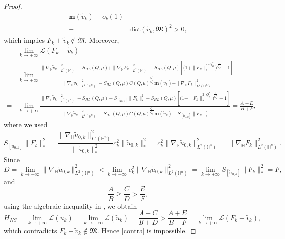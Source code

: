 \documentclass[10pt,a4paper]{amsart}
\begin{document}
\begin{proof}
\begin{align*}
 \mathbf{m}(\tilde{v}_k)+o_k(1)\\
 =&\mathrm{dist}(\tilde{v}_k,\mathfrak{M})^2>0,
 \end{align*}
{which implies $F_k+\tilde v_k\notin\mathfrak M$. Moreover,}
 \begin{align*}
 &\lim\limits_{k\rightarrow+\infty} \mathcal{L}(F_k+\tilde{v}_k)\\=&
\lim\limits_{k\rightarrow+\infty}\frac{\|\nabla_\mathbb{H} \tilde{v}_k\|_{L^2(\mathbb{H}^n)}^2-S_{HL}(Q,\mu)+\|\nabla_\mathbb{H} F_k\|_{L^2(\mathbb{H}^n)}^2-S_{HL}(Q,\mu) \left[\Big(1+\|F_k\|_*^{2\cdot Q^{\ast}_{\mu}}\Big)^{\frac{1}{Q^{\ast}_{\mu}}}-1\right]}
{\|\nabla_\mathbb{H} \tilde{v}_k\|_{L^2(\mathbb{H}^n)}^2-S_{HL}(Q,\mu)C(Q,\mu)^{\frac{Q^{\ast}}{Q^{\ast}_{\mu}}}\mathbf{m}(\tilde{v}_k)+
\|\nabla_\mathbb{H} F_k\|_{L^2(\mathbb{H}^n)}^2}\\
=&\lim\limits_{k\rightarrow+\infty}\frac{\|\nabla_\mathbb{H} \tilde{v}_k\|_{L^2(\mathbb{H}^n)}^2-S_{HL}(Q,\mu)+S_{[\tilde{u}_{0,k}]}\|F_k\|_*^2-S_{HL}(Q,\mu) \left[\Big(1+\|F_k\|_*^{2\cdot Q^{\ast}_{\mu}}\Big)^{\frac{1}{Q^{\ast}_{\mu}}}-1\right]}
{\|\nabla_\mathbb{H} \tilde{v}_k\|_{L^2(\mathbb{H}^n)}^2-S_{HL}(Q,\mu)C(Q,\mu)^{\frac{Q^{\ast}}{Q^{\ast}_{\mu}}}\mathbf{m}(\tilde{v}_k)+
S_{[\tilde{u}_{0,k}]}\|F_k\|_*^2}
=\frac{A+E}{B+F},
\end{align*}
{where we used}
\begin{equation*}
 S_{[\tilde{u}_{0,k}]}\|F_k\|_*^2=\frac{\|\nabla_\mathbb{H} \tilde{u}_{0,k}\|_{L^2(\mathbb{H}^n)}^2}{\|\tilde{u}_{0,k}\|_*^2}c_k^2\|\tilde{u}_{0,k}\|_*^2
 =c_k^2\|\nabla_\mathbb{H} \tilde{u}_{0,k}\|_{L^2(\mathbb{H}^n)}^2=\|\nabla_\mathbb{H} F_k\|_{L^2(\mathbb{H}^n)}^2.
\end{equation*}
Since
\begin{equation*}
 D=\lim\limits_{k\rightarrow+\infty}\|\nabla_\mathbb{H} \tilde{u}_{0,k}\|_{L^2(\mathbb{H}^n)}^2<\lim\limits_{k\rightarrow+\infty}c_k^2\|\nabla_\mathbb{H} \tilde{u}_{0,k}\|_{L^2(\mathbb{H}^n)}^2
 =\lim\limits_{k\rightarrow+\infty}S_{[\tilde{u}_{0,k}]}\|F_k\|_*^2=F,
\end{equation*}
 and
 \begin{equation*}
 \frac{A}{B}\geq \frac{C}{D}>\frac{E}{F},
 \end{equation*}
 using the algebraic inequality in \cite[Lemma 2.4]{K25}, we obtain
 \begin{equation*}
 H_{NS}=\lim\limits_{k\rightarrow+\infty} \mathcal{L}(u_k)=\lim\limits_{k\rightarrow+\infty} \mathcal{L} (\tilde{u}_k)=\frac{A+C}{B+D}>\frac{A+E}{B+F}=\lim\limits_{k\rightarrow+\infty} \mathcal{L}(F_k+\tilde{v}_k),
 \end{equation*}
{which contradicts $F_k+\tilde v_k\notin\mathfrak M$. Hence \eqref{contra} is impossible.}


\end{proof}
\end{document}
